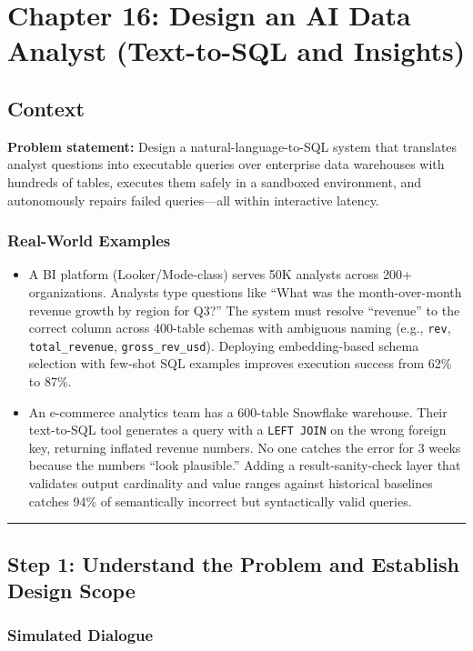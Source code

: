 \chapter{Chapter 16: Design an AI Data Analyst (Text-to-SQL and Insights)}

\section*{Context}

\textbf{Problem statement:} Design a natural-language-to-SQL system that translates analyst questions into executable queries over enterprise data warehouses with hundreds of tables, executes them safely in a sandboxed environment, and autonomously repairs failed queries---all within interactive latency.

\subsection*{Real-World Examples}

\begin{itemize}
  \item A BI platform (Looker/Mode-class) serves 50K analysts across 200+ organizations. Analysts type questions like ``What was the month-over-month revenue growth by region for Q3?'' The system must resolve ``revenue'' to the correct column across 400-table schemas with ambiguous naming (e.g., \texttt{rev}, \texttt{total\_revenue}, \texttt{gross\_rev\_usd}). Deploying embedding-based schema selection with few-shot SQL examples improves execution success from 62\% to 87\%.
  \item An e-commerce analytics team has a 600-table Snowflake warehouse. Their text-to-SQL tool generates a query with a \texttt{LEFT JOIN} on the wrong foreign key, returning inflated revenue numbers. No one catches the error for 3 weeks because the numbers ``look plausible.'' Adding a result-sanity-check layer that validates output cardinality and value ranges against historical baselines catches 94\% of semantically incorrect but syntactically valid queries.
\end{itemize}

\bigskip\hrule\bigskip

\section*{Step 1: Understand the Problem and Establish Design Scope}

\subsection*{Simulated Dialogue}

